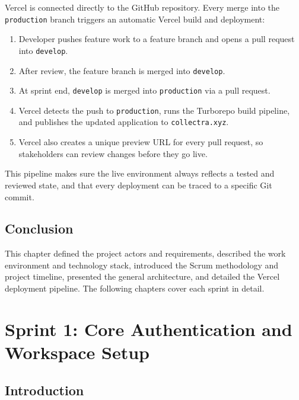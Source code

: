 \documentclass[12pt,a4paper]{report}
\begin{document}
Vercel is connected directly to the GitHub repository.
Every merge into the \texttt{production} branch triggers an automatic Vercel build
and deployment:

\begin{enumerate}
  \item Developer pushes feature work to a feature branch and opens a pull request
        into \texttt{develop}.
  \item After review, the feature branch is merged into \texttt{develop}.
  \item At sprint end, \texttt{develop} is merged into \texttt{production} via a
        pull request.
  \item Vercel detects the push to \texttt{production}, runs the Turborepo build
        pipeline, and publishes the updated application to \texttt{collectra.xyz}.
  \item Vercel also creates a unique preview URL for every pull request, so
        stakeholders can review changes before they go live.
\end{enumerate}

This pipeline makes sure the live environment always reflects a tested and reviewed
state, and that every deployment can be traced to a specific Git commit.

\section*{Conclusion}
{}

This chapter defined the project actors and requirements, described the work
environment and technology stack, introduced the Scrum methodology and project
timeline, presented the general architecture, and detailed the Vercel deployment
pipeline.
The following chapters cover each sprint in detail.

\chapter{Sprint 1: Core Authentication and Workspace Setup}
\label{chap:sprint1}

\section*{Introduction}
{}
\end{document}
